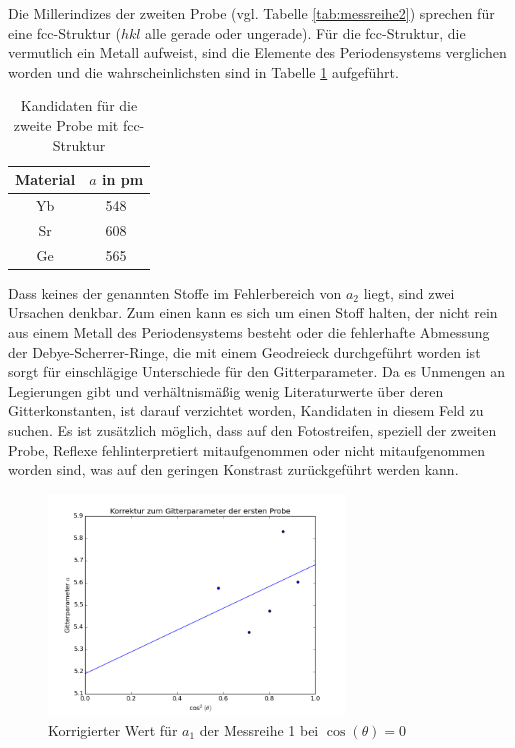 \noindent
Die Millerindizes der zweiten Probe (vgl. Tabelle \ref{tab:messreihe2}) sprechen für eine fcc-Struktur ($hkl$ alle gerade oder ungerade).
Für die fcc-Struktur, die vermutlich ein Metall aufweist, sind die Elemente des Periodensystems verglichen worden und die wahrscheinlichsten sind in 
Tabelle \ref{tab:matProb2} aufgeführt.

\begin{table}[H]
 \begin{tabular}{cc}
Material &$a$ in pm\\
\hline
Yb& 548\\
Sr & 608\\
Ge & 565\\
  
 \end{tabular}
 \caption{Kandidaten für die zweite Probe mit fcc-Struktur}
 \label{tab:matProb2}

\end{table}
\noindent Dass keines der genannten Stoffe im Fehlerbereich von $a_2$ liegt, sind zwei Ursachen denkbar. Zum einen kann es sich um einen Stoff halten, der nicht
rein aus einem Metall des Periodensystems besteht oder die fehlerhafte Abmessung der Debye-Scherrer-Ringe, die mit einem Geodreieck durchgeführt worden ist
sorgt für einschlägige Unterschiede für den Gitterparameter. Da es Unmengen an Legierungen gibt und verhältnismäßig wenig Literaturwerte über deren
Gitterkonstanten, ist darauf verzichtet worden, Kandidaten in diesem Feld zu suchen. Es ist zusätzlich möglich, dass auf den Fotostreifen, speziell
der zweiten Probe, Reflexe fehlinterpretiert mitaufgenommen oder nicht mitaufgenommen worden sind, was auf den geringen Konstrast zurückgeführt werden kann.

\begin{figure}[n]
 \includegraphics[width=0.7\textwidth]{../auswertung/a1.png}
 \caption{Korrigierter Wert für $a_1$ der Messreihe 1 bei $\cos(\theta)=0$}
 \label{pic:fita1}
\end{figure}

